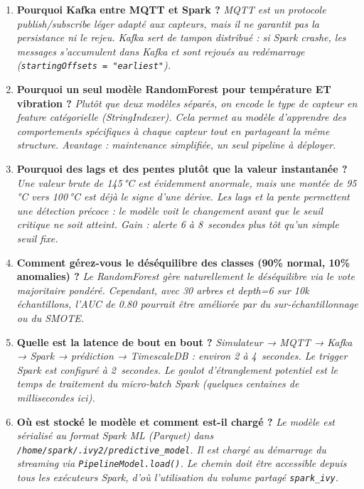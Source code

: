 \documentclass[12pt,a4paper]{article}
\begin{document}
\begin{enumerate}
    \item \textbf{Pourquoi Kafka entre MQTT et Spark ?}
    \textit{MQTT est un protocole publish/subscribe léger adapté aux capteurs, mais il ne garantit pas la persistance ni le rejeu. Kafka sert de tampon distribué : si Spark crashe, les messages s'accumulent dans Kafka et sont rejoués au redémarrage (\texttt{startingOffsets = "earliest"}).}

    \item \textbf{Pourquoi un seul modèle RandomForest pour température ET vibration ?}
    \textit{Plutôt que deux modèles séparés, on encode le type de capteur en feature catégorielle (StringIndexer). Cela permet au modèle d'apprendre des comportements spécifiques à chaque capteur tout en partageant la même structure. Avantage : maintenance simplifiée, un seul pipeline à déployer.}

    \item \textbf{Pourquoi des lags et des pentes plutôt que la valeur instantanée ?}
    \textit{Une valeur brute de 145\,°C est évidemment anormale, mais une montée de 95\,°C vers 100\,°C est déjà le signe d'une dérive. Les lags et la pente permettent une détection précoce : le modèle voit le changement avant que le seuil critique ne soit atteint. Gain : alerte 6 à 8~secondes plus tôt qu'un simple seuil fixe.}

    \item \textbf{Comment gérez-vous le déséquilibre des classes (90\% normal, 10\% anomalies) ?}
    \textit{Le RandomForest gère naturellement le déséquilibre via le vote majoritaire pondéré. Cependant, avec 30 arbres et depth=6 sur 10k échantillons, l'AUC de 0.80 pourrait être améliorée par du sur-échantillonnage ou du SMOTE.}

    \item \textbf{Quelle est la latence de bout en bout ?}
    \textit{Simulateur → MQTT → Kafka → Spark → prédiction → TimescaleDB : environ 2 à 4~secondes. Le trigger Spark est configuré à 2~secondes. Le goulot d'étranglement potentiel est le temps de traitement du micro-batch Spark (quelques centaines de millisecondes ici).}

    \item \textbf{Où est stocké le modèle et comment est-il chargé ?}
    \textit{Le modèle est sérialisé au format Spark ML (Parquet) dans \texttt{/home/spark/.ivy2/predictive\_model}. Il est chargé au démarrage du streaming via \texttt{PipelineModel.load()}. Le chemin doit être accessible depuis tous les exécuteurs Spark, d'où l'utilisation du volume partagé \texttt{spark\_ivy}.}
\end{enumerate}
\end{document}
